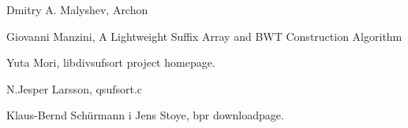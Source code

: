 {\begin{enumerate}[{[}A{]}]
			\item \label{archon} Dmitry A. Malyshev, Archon \\

			\item \label{MFcode} Giovanni Manzini, A Lightweight Suffix Array and BWT Construction Algorithm \\
				
			\item \label{libdivsufsort} Yuta Mori, libdivsufsort project homepage. \\
				
				
			\item \label{LScode} N.Jesper Larsson, qsufsort.c \\
				
\item \label{bpr-code}  Klaus-Bernd Sch\"{u}rmann i Jens Stoye, bpr downloadpage. \\


		
\end{enumerate}
}

